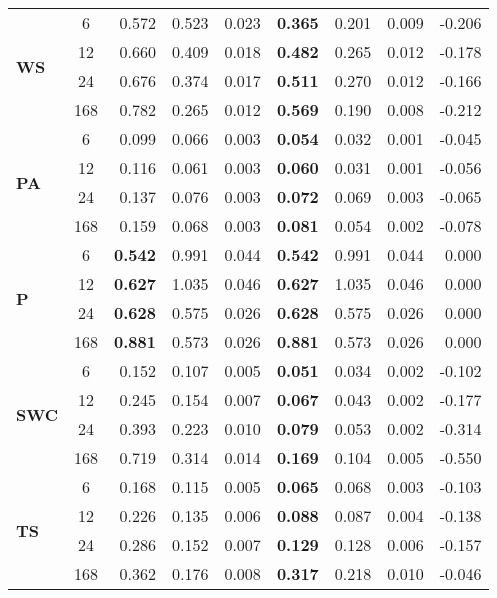 \begin{table}
\begin{tabular}{p{2.1cm}c|rrr|rrr|r}
\cline{1-9}
\multirow[c]{4}{*}{\parbox{2.1cm}{\textbf{WS}}} & 6 & 0.572 & 0.523 & 0.023 & \bfseries 0.365 & 0.201 & 0.009 & -0.206 \\
 & 12 & 0.660 & 0.409 & 0.018 & \bfseries 0.482 & 0.265 & 0.012 & -0.178 \\
 & 24 & 0.676 & 0.374 & 0.017 & \bfseries 0.511 & 0.270 & 0.012 & -0.166 \\
 & 168 & 0.782 & 0.265 & 0.012 & \bfseries 0.569 & 0.190 & 0.008 & -0.212 \\
\cline{1-9}
\multirow[c]{4}{*}{\parbox{2.1cm}{\textbf{PA}}} & 6 & 0.099 & 0.066 & 0.003 & \bfseries 0.054 & 0.032 & 0.001 & -0.045 \\
 & 12 & 0.116 & 0.061 & 0.003 & \bfseries 0.060 & 0.031 & 0.001 & -0.056 \\
 & 24 & 0.137 & 0.076 & 0.003 & \bfseries 0.072 & 0.069 & 0.003 & -0.065 \\
 & 168 & 0.159 & 0.068 & 0.003 & \bfseries 0.081 & 0.054 & 0.002 & -0.078 \\
\cline{1-9}
\multirow[c]{4}{*}{\parbox{2.1cm}{\textbf{P}}} & 6 & \bfseries 0.542 & 0.991 & 0.044 & \bfseries 0.542 & 0.991 & 0.044 & 0.000 \\
 & 12 & \bfseries 0.627 & 1.035 & 0.046 & \bfseries 0.627 & 1.035 & 0.046 & 0.000 \\
 & 24 & \bfseries 0.628 & 0.575 & 0.026 & \bfseries 0.628 & 0.575 & 0.026 & 0.000 \\
 & 168 & \bfseries 0.881 & 0.573 & 0.026 & \bfseries 0.881 & 0.573 & 0.026 & 0.000 \\
\cline{1-9}
\multirow[c]{4}{*}{\parbox{2.1cm}{\textbf{SWC}}} & 6 & 0.152 & 0.107 & 0.005 & \bfseries 0.051 & 0.034 & 0.002 & -0.102 \\
 & 12 & 0.245 & 0.154 & 0.007 & \bfseries 0.067 & 0.043 & 0.002 & -0.177 \\
 & 24 & 0.393 & 0.223 & 0.010 & \bfseries 0.079 & 0.053 & 0.002 & -0.314 \\
 & 168 & 0.719 & 0.314 & 0.014 & \bfseries 0.169 & 0.104 & 0.005 & -0.550 \\
\cline{1-9}
\multirow[c]{4}{*}{\parbox{2.1cm}{\textbf{TS}}} & 6 & 0.168 & 0.115 & 0.005 & \bfseries 0.065 & 0.068 & 0.003 & -0.103 \\
 & 12 & 0.226 & 0.135 & 0.006 & \bfseries 0.088 & 0.087 & 0.004 & -0.138 \\
 & 24 & 0.286 & 0.152 & 0.007 & \bfseries 0.129 & 0.128 & 0.006 & -0.157 \\
 & 168 & 0.362 & 0.176 & 0.008 & \bfseries 0.317 & 0.218 & 0.010 & -0.046 \\
\cline{1-9}
\bottomrule
\end{tabular}
\end{table}
